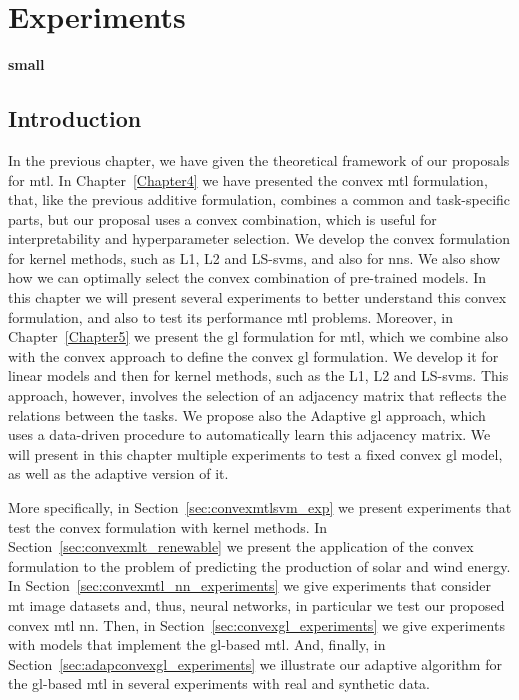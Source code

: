 
\chapter{Experiments} %
\label{Chapter6}

{\bf \small{
small  }}

\section{Introduction}
In the previous chapter, we have given the theoretical framework of our proposals for \acrfull{mtl}. In Chapter~\ref{Chapter4} we have presented the convex \acrshort{mtl} formulation, that, like the previous additive formulation, combines a common and task-specific parts, but our proposal uses a convex combination, which is useful for interpretability and hyperparameter selection.
We develop the convex formulation for kernel methods, such as L1, L2 and LS-\acrshort{svms}, and also for \acrfull{nns}. We also show how we can optimally select the convex combination of pre-trained models.
%
In this chapter we will present several experiments to better understand this convex formulation, and also to test its performance \acrshort{mtl} problems.
%
Moreover, in Chapter~\ref{Chapter5} we present the \acrfull{gl} formulation for \acrshort{mtl}, which we combine also with the convex approach to define the convex \acrshort{gl} formulation.
We develop it for linear models and then for kernel methods, such as the L1, L2 and LS-\acrshort{svms}. This approach, however, involves the selection of an adjacency matrix that reflects the relations between the tasks. We propose also the Adaptive \acrshort{gl} approach, which uses a data-driven procedure to automatically learn this adjacency matrix.
%
We will present in this chapter multiple experiments to test a fixed convex \acrshort{gl} model, as well as the adaptive version of it.
%

More specifically, in Section~\ref{sec:convexmtlsvm_exp} we present experiments that test the convex formulation with kernel methods. In Section~\ref{sec:convexmlt_renewable} we present the application of the convex formulation to the problem of predicting the production of solar and wind energy.
In Section~\ref{sec:convexmtl_nn_experiments} we give experiments that consider \acrfull{mt} image datasets and, thus, neural networks, in particular we test our proposed convex \acrshort{mtl} \acrshort{nn}. 
%
Then, in Section~\ref{sec:convexgl_experiments} we give experiments with models that implement the \acrshort{gl}-based \acrshort{mtl}. And, finally, in Section~\ref{sec:adapconvexgl_experiments} we illustrate our adaptive algorithm for the \acrshort{gl}-based \acrshort{mtl} in several experiments with real and synthetic data.






